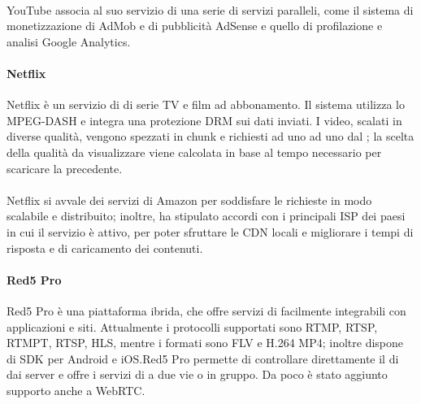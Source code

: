 		\paragraph*{}
		YouTube associa al suo servizio di  una serie di servizi paralleli, come il sistema di monetizzazione di AdMob e di pubblicità AdSense e quello di profilazione e analisi Google Analytics.
	
		\paragraph{Netflix}
		Netflix è un servizio di   di serie TV e film ad abbonamento. Il sistema utilizza lo  \gls{MPEG-DASH} e integra una protezione \gls{DRM} sui dati inviati. I video, scalati in diverse qualità, vengono spezzati in chunk e richiesti ad uno ad uno dal ; la scelta della qualità da visualizzare viene calcolata in base al tempo necessario per scaricare la precedente.
		\paragraph*{}
		Netflix si avvale dei servizi  di Amazon per soddisfare le richieste in modo scalabile e distribuito; inoltre, ha stipulato accordi con i principali \gls{ISP} dei paesi in cui il servizio è attivo, per poter sfruttare le \gls{CDN} locali e migliorare i tempi di risposta e di caricamento dei contenuti.
	
		\paragraph{Red5 Pro}
		Red5 Pro è una piattaforma ibrida, che offre servizi di  facilmente integrabili con applicazioni e siti. Attualmente i protocolli supportati sono \gls{RTMP}, \gls{RTSP}, \gls{RTMPT}, \gls{RTSP}, \gls{HLS}, mentre i formati sono FLV e H.264 MP4; inoltre dispone di \gls{SDK} per Android e iOS.\@ Red5 Pro permette di controllare direttamente il  di  dai server e offre i servizi di  a due vie o in gruppo. Da poco è stato aggiunto supporto anche a WebRTC.\@
	
